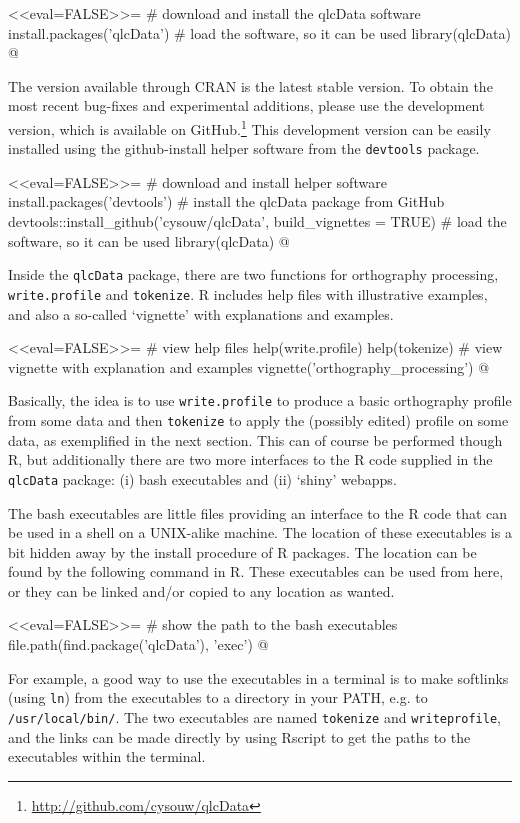 <<eval=FALSE>>=
# download and install the qlcData software
install.packages('qlcData') 
# load the software, so it can be used
library(qlcData) 
@

The version available through CRAN is the latest stable version.
To obtain the most recent bug-fixes and experimental additions, please use the
development version, which is available on
GitHub.\footnote{\url{http://github.com/cysouw/qlcData}} This development
version can be easily installed using the github-install helper software from the
\texttt{devtools} package.

<<eval=FALSE>>=
# download and install helper software
install.packages('devtools') 
# install the qlcData package from GitHub
devtools::install_github('cysouw/qlcData', build_vignettes = TRUE)
# load the software, so it can be used 
library(qlcData) 
@

Inside the \texttt{qlcData} package, there are two functions for
orthography processing, \texttt{write.profile} and \texttt{tokenize}. R includes
help files with illustrative examples, and also a so-called `vignette' with
explanations and examples.

<<eval=FALSE>>=
# view help files
help(write.profile)
help(tokenize)
# view vignette with explanation and examples
vignette('orthography_processing')
@

Basically, the idea is to use \texttt{write.profile} to produce a
basic orthography profile from some data and then \texttt{tokenize} to apply the
(possibly edited) profile on some data, as exemplified in the next section. This
can of course be performed though R, but additionally there are two more
interfaces to the R code supplied in the \texttt{qlcData} package: (i) bash
executables and (ii) `shiny' webapps.

The bash executables are little files providing an interface to the R code that
can be used in a shell on a UNIX-alike machine. The location of these
executables is a bit hidden away by the install procedure of R packages. The
location can be found by the following command in R. These executables can be 
used from here, or they can be linked and/or copied to any location as wanted.

<<eval=FALSE>>=
# show the path to the bash executables
file.path(find.package('qlcData'), 'exec')
@

For example, a good way to use the executables in a terminal is to
make softlinks (using \texttt{ln}) from the executables to a directory in your
PATH, e.g. to \texttt{/usr/local/bin/}. The two executables are named
\texttt{tokenize} and \texttt{writeprofile}, and the links can be made directly 
by using Rscript to get the paths to the executables within the terminal.

